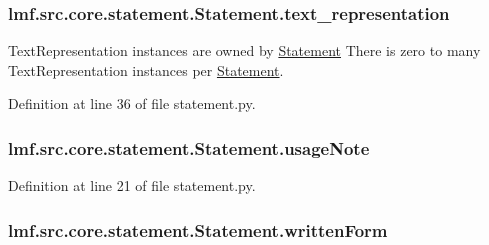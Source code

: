 \hypertarget{classlmf_1_1src_1_1core_1_1statement_1_1_statement_af2781856fbb02d55acc39864ec66aa24}{
\subsubsection[{text\+\_\+representation}]{\setlength{\rightskip}{0pt plus 5cm}lmf.\+src.\+core.\+statement.\+Statement.\+text\+\_\+representation}}\label{classlmf_1_1src_1_1core_1_1statement_1_1_statement_af2781856fbb02d55acc39864ec66aa24}


Text\+Representation instances are owned by \hyperlink{classlmf_1_1src_1_1core_1_1statement_1_1_statement}{Statement} There is zero to many Text\+Representation instances per \hyperlink{classlmf_1_1src_1_1core_1_1statement_1_1_statement}{Statement}. 



Definition at line 36 of file statement.\+py.

\hypertarget{classlmf_1_1src_1_1core_1_1statement_1_1_statement_a2e146c5f5de5eed52c082c2cc0bea7d0}{
\subsubsection[{usage\+Note}]{\setlength{\rightskip}{0pt plus 5cm}lmf.\+src.\+core.\+statement.\+Statement.\+usage\+Note}}\label{classlmf_1_1src_1_1core_1_1statement_1_1_statement_a2e146c5f5de5eed52c082c2cc0bea7d0}


Definition at line 21 of file statement.\+py.

\hypertarget{classlmf_1_1src_1_1core_1_1statement_1_1_statement_a4126cee37a75d852056ae49f45cf6cc3}{
\subsubsection[{written\+Form}]{\setlength{\rightskip}{0pt plus 5cm}lmf.\+src.\+core.\+statement.\+Statement.\+written\+Form}}\label{classlmf_1_1src_1_1core_1_1statement_1_1_statement_a4126cee37a75d852056ae49f45cf6cc3}


